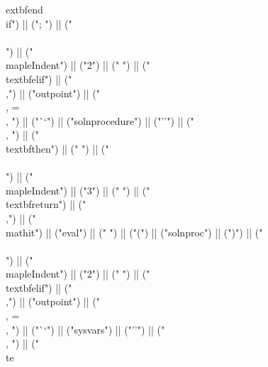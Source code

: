\documentclass{article}
\begin{document}
\begin{center}
\begin{maplelatex}
{extbf{end\\ if}") || ("; ") || ("\\\\\n") || ("\\mapleIndent{") || ("2") || ("} ") || ("\\textbf{elif}") || (" \\,") || ("outpoint") || (" \\, = \\, ") || ("``") || ("solnprocedure") || ("''") || (" \\, ") || ("\\textbf{then}") || (" ") || ("\\\\\n") || ("\\mapleIndent{") || ("3") || ("} ") || ("\\textbf{return}") || ("\\,") || ("\\mathit{") || ("eval") || ("} ") || ("(") || ("solnproc") || (")") || ("\\\\\n") || ("\\mapleIndent{") || ("2") || ("} ") || ("\\textbf{elif}") || (" \\,") || ("outpoint") || (" \\, = \\, ") || ("``") || ("sysvars") || ("''") || (" \\, ") || ("\\te}
\end{maplelatex}
\end{center}
\end{document}

